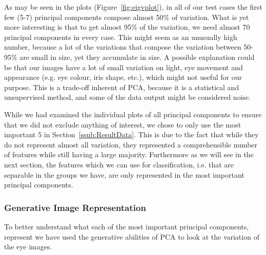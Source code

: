 As may be seen in the plots (Figure~\ref{fig:eigvplot}), in all of our test cases the first few (5-7) principal components compose almost
50\% of variation.
What is yet more interesting is that to get almost 95\% of the variation, we need almost 70 principal components in every case.
This might seem as an unusually high number, because a lot of the variations that compose the variation between 50-95\% are small in size, yet
they accumulate in size.
A possible explanation could be that our images have a lot of small variation on light, eye movement and appearance (e.g. eye colour, iris shape, etc.),
which might not useful for our purpose. This is a trade-off inherent of PCA, because it is a statistical and unsupervised method, and some of the data output
might be considered noise.

While we had examined the individual plots of all principal components to ensure that we did not exclude anything of interest, we chose to only use the most important 5 in Section~\ref{ssub:ResultData}.
This is due to the fact that while they do not represent almost all variation, they represented a comprehensible number of features while
still having a large majority. Furthermore as we will see in the next section, the features which we can use for classification, i.e. that are separable in the groups we have, are
only represented in the most important principal components.

\subsubsection{Generative Image Representation}
\label{ssub:GenerativeImageRepresentation}

To better understand what each of the most important principal components, represent we have used the generative abilities of PCA 
to look at the variation of the eye images.\\

